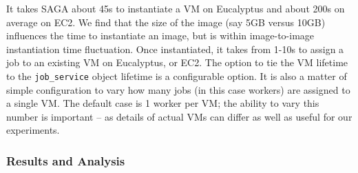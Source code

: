 \documentclass[3p,twocolumn]{elsarticle}
\begin{document}
It takes SAGA about 45s to instantiate a VM on Eucalyptus
  and about 200s on average on EC2.
We find that the size of the image (say 5GB versus 10GB) influences
the time to instantiate an image, but is within image-to-image
instantiation time fluctuation.  Once instantiated, it takes from
1-10s to assign a job to an existing VM on Eucalyptus, or EC2.  The
option to tie the VM lifetime to the \texttt{job\_service} object
lifetime is a configurable option.  It is also a matter of simple
configuration to vary how many jobs (in this case workers) are
assigned to a single VM. The default case is 1 worker per VM; the
ability to vary this number is important -- as details of actual VMs
can differ as well as useful for our experiments.




\subsubsection*{Results and Analysis}
\end{document}
